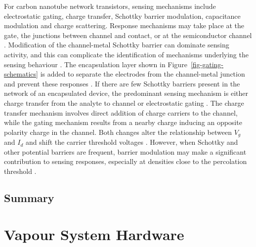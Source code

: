 \documentclass[
  a4paper,
]{scrbook}
\begin{document}
For carbon nanotube network transistors, sensing mechanisms include
electrostatic gating, charge transfer, Schottky barrier modulation,
capacitance modulation and charge scattering. Response mechanisms may
take place at the gate, the junctions between channel and contact, or at
the semiconductor channel
\autocite{Heller2008,Battie2011,Boyd2014,Tran2016,Li2023}. Modification
of the channel-metal Schottky barrier can dominate sensing activity, and
this can complicate the identification of mechanisms underlying the
sensing behaviour \autocite{Cao2009,Boyd2014,Schroeder2019}. The
encapsulation layer shown in Figure~\ref{fig-gating-schematics} is added
to separate the electrodes from the channel-metal junction and prevent
these responses \autocite{Heller2008,Shkodra2021}. If there are few
Schottky barriers present in the network of an encapsulated device, the
predominant sensing mechanism is either charge transfer from the analyte
to channel \autocite{Allen2007,Battie2011} or electrostatic gating
\autocite{Heller2008}. The charge transfer mechanism involves direct
addition of charge carriers to the channel, while the gating mechanism
results from a nearby charge inducing an opposite polarity charge in the
channel. Both changes alter the relationship between \(V_g\) and \(I_d\)
and shift the carrier threshold voltages
\autocite{Tran2016,Shkodra2021,Li2023}. However, when Schottky and other
potential barriers are frequent, barrier modulation may make a
significant contribution to sensing responses, especially at densities
close to the percolation threshold \autocite{Boyd2014,Murugathas2019a}.

\hypertarget{summary}{%
\section{Summary}\label{summary}}

\cleardoublepage
{}
{}
\appendix

\hypertarget{sec-vapour-sensor-components}{%
\chapter{Vapour System Hardware}\label{sec-vapour-sensor-components}}
\end{document}
